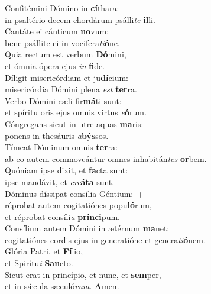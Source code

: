 \evenverse Confitémini Dómino in \textbf{cí}thara:~\*\\
\evenverse in psaltério decem chordárum psálli\textit{te} \textbf{il}li.\\
\oddverse Cantáte ei cánticum \textbf{no}vum:~\*\\
\oddverse bene psállite ei in vocifera\textit{ti}\textbf{ó}ne.\\
\evenverse Quia rectum est verbum \textbf{Dó}mini,~\*\\
\evenverse et ómnia ópera ejus \textit{in} \textbf{fi}de.\\
\oddverse Díligit misericórdiam et ju\textbf{dí}cium:~\*\\
\oddverse misericórdia Dómini plena \textit{est} \textbf{ter}ra.\\
\evenverse Verbo Dómini cæli fir\textbf{má}ti sunt:~\*\\
\evenverse et spíritu oris ejus omnis virtus \textit{e}\textbf{ó}rum.\\
\oddverse Cóngregans sicut in utre aquas \textbf{ma}ris:~\*\\
\oddverse ponens in thesáuris \textit{a}\textbf{býs}sos.\\
\evenverse Tímeat Dóminum omnis \textbf{ter}ra:~\*\\
\evenverse ab eo autem commoveántur omnes inhabitán\textit{tes} \textbf{or}bem.\\
\oddverse Quóniam ipse dixit, et \textbf{fa}cta sunt:~\*\\
\oddverse ipse mandávit, et \textit{cre}\textbf{á}\textbf{ta} sunt.\\
\evenverse Dóminus díssipat consília Géntium:~+\\
\evenverse  réprobat autem cogitatiónes popu\textbf{ló}rum,~\*\\
\evenverse et réprobat consíli\textit{a} \textbf{prín}\textbf{ci}pum.\\
\oddverse Consílium autem Dómini in ætérnum \textbf{ma}net:~\*\\
\oddverse cogitatiónes cordis ejus in generatióne et genera\textit{ti}\textbf{ó}nem.\\
\evenverse Glória Patri, et \textbf{Fí}lio,~\*\\
\evenverse et Spirítu\textit{i} \textbf{San}cto.\\
\oddverse Sicut erat in princípio, et nunc, et \textbf{sem}per,~\*\\
\oddverse et in sǽcula sæculó\textit{rum}. \textbf{A}men.\\
